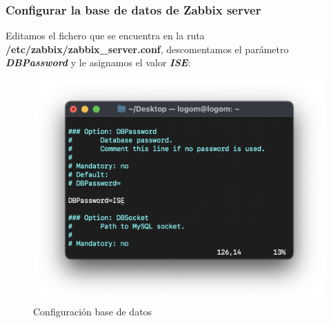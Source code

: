     \subsubsection{Configurar la base de datos de Zabbix server}
    Editamos el fichero que se encuentra en la ruta \textbf{/etc/zabbix/zabbix\_server.conf}, descomentamos el parámetro \textbf{\emph{DBPassword}} y le
    asignamos el valor \textbf{\emph{ISE}}:
    \begin{figure}[H]
        \centering
        \includegraphics[scale=0.4]{images/zabbix_server_conf.png}
        \caption{Configuración base de datos}
        \label{fig:zabbix_conf}
    \end{figure}


